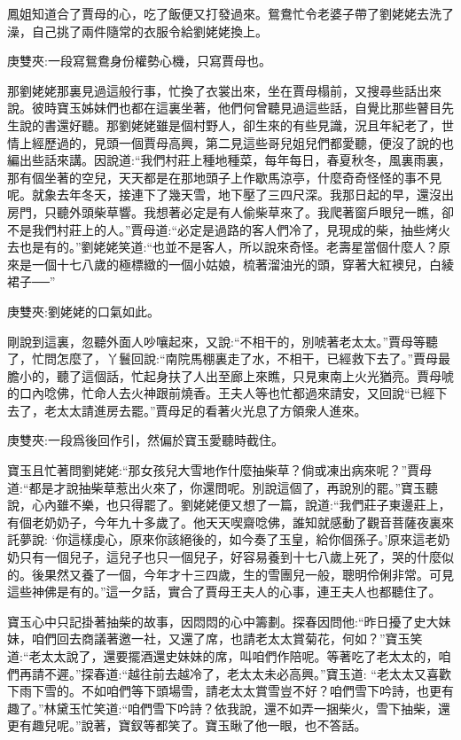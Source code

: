 \begin{parag}
    鳳姐知道合了賈母的心，吃了飯便又打發過來。鴛鴦忙令老婆子帶了劉姥姥去洗了澡，自己挑了兩件隨常的衣服令給劉姥姥換上。\begin{note}庚雙夾:一段寫鴛鴦身份權勢心機，只寫賈母也。\end{note}那劉姥姥那裏見過這般行事，忙換了衣裳出來，坐在賈母榻前，又搜尋些話出來說。彼時寶玉姊妹們也都在這裏坐著，他們何曾聽見過這些話，自覺比那些瞽目先生說的書還好聽。那劉姥姥雖是個村野人，卻生來的有些見識，況且年紀老了，世情上經歷過的，見頭一個賈母高興，第二見這些哥兒姐兒們都愛聽，便沒了說的也編出些話來講。因說道:“我們村莊上種地種菜，每年每日，春夏秋冬，風裏雨裏，那有個坐著的空兒，天天都是在那地頭子上作歇馬涼亭，什麼奇奇怪怪的事不見呢。就象去年冬天，接連下了幾天雪，地下壓了三四尺深。我那日起的早，還沒出房門，只聽外頭柴草響。我想著必定是有人偷柴草來了。我爬著窗戶眼兒一瞧，卻不是我們村莊上的人。”賈母道:“必定是過路的客人們冷了，見現成的柴，抽些烤火去也是有的。”劉姥姥笑道:“也並不是客人，所以說來奇怪。老壽星當個什麼人？原來是一個十七八歲的極標緻的一個小姑娘，梳著溜油光的頭，穿著大紅襖兒，白綾裙子──”\begin{note}庚雙夾:劉姥姥的口氣如此。\end{note}剛說到這裏，忽聽外面人吵嚷起來，又說:“不相干的，別唬著老太太。”賈母等聽了，忙問怎麼了，丫鬟回說:“南院馬棚裏走了水，不相干，已經救下去了。”賈母最膽小的，聽了這個話，忙起身扶了人出至廊上來瞧，只見東南上火光猶亮。賈母唬的口內唸佛，忙命人去火神跟前燒香。王夫人等也忙都過來請安，又回說“已經下去了，老太太請進房去罷。”賈母足的看著火光息了方領衆人進來。\begin{note}庚雙夾:一段爲後回作引，然偏於寶玉愛聽時截住。\end{note}寶玉且忙著問劉姥姥:“那女孩兒大雪地作什麼抽柴草？倘或凍出病來呢？”賈母道:“都是才說抽柴草惹出火來了，你還問呢。別說這個了，再說別的罷。”寶玉聽說，心內雖不樂，也只得罷了。劉姥姥便又想了一篇，說道:“我們莊子東邊莊上，有個老奶奶子，今年九十多歲了。他天天喫齋唸佛，誰知就感動了觀音菩薩夜裏來託夢說: ‘你這樣虔心，原來你該絕後的，如今奏了玉皇，給你個孫子。’原來這老奶奶只有一個兒子，這兒子也只一個兒子，好容易養到十七八歲上死了，哭的什麼似的。後果然又養了一個，今年才十三四歲，生的雪團兒一般，聰明伶俐非常。可見這些神佛是有的。”這一夕話，實合了賈母王夫人的心事，連王夫人也都聽住了。
\end{parag}


\begin{parag}
    寶玉心中只記掛著抽柴的故事，因悶悶的心中籌劃。探春因問他:“昨日擾了史大妹妹，咱們回去商議著邀一社，又還了席，也請老太太賞菊花，何如？”寶玉笑道:“老太太說了，還要擺酒還史妹妹的席，叫咱們作陪呢。等著吃了老太太的，咱們再請不遲。”探春道:“越往前去越冷了，老太太未必高興。”寶玉道: “老太太又喜歡下雨下雪的。不如咱們等下頭場雪，請老太太賞雪豈不好？咱們雪下吟詩，也更有趣了。”林黛玉忙笑道:“咱們雪下吟詩？依我說，還不如弄一捆柴火，雪下抽柴，還更有趣兒呢。”說著，寶釵等都笑了。寶玉瞅了他一眼，也不答話。
\end{parag}


